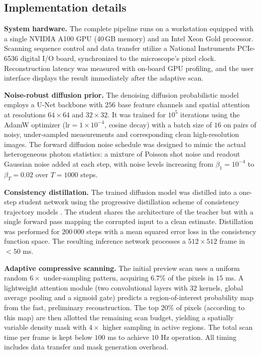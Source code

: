 \documentclass{article}
\begin{document}
\subsection{Implementation details}
\label{subsec:implementation}
\textbf{System hardware.} The complete pipeline runs on a workstation equipped with a single NVIDIA A100 GPU (40\,GB memory) and an Intel Xeon Gold processor. Scanning sequence control and data transfer utilize a National Instruments PCIe-6536 digital I/O board, synchronized to the microscope’s pixel clock. Reconstruction latency was measured with on-board GPU profiling, and the user interface displays the result immediately after the adaptive scan.

\textbf{Noise-robust diffusion prior.} The denoising diffusion probabilistic model employs a U-Net backbone with $256$ base feature channels and spatial attention at resolutions $64\times64$ and $32\times32$. It was trained for $10^5$ iterations using the AdamW optimizer ($\mathrm{lr}=1\times10^{-4}$, cosine decay) with a batch size of $16$ on pairs of noisy, under-sampled measurements and corresponding clean high-resolution images. The forward diffusion noise schedule was designed to mimic the actual heterogeneous photon statistics: a mixture of Poisson shot noise and readout Gaussian noise added at each step, with noise levels increasing from $\beta_1=10^{-4}$ to $\beta_T=0.02$ over $T=1000$ steps.

\textbf{Consistency distillation.} The trained diffusion model was distilled into a one-step student network using the progressive distillation scheme of consistency trajectory models \cite{CTM}. The student shares the architecture of the teacher but with a single forward pass mapping the corrupted input to a clean estimate. Distillation was performed for $200\,000$ steps with a mean squared error loss in the consistency function space. The resulting inference network processes a $512\times512$ frame in $<50$ ms.

\textbf{Adaptive compressive scanning.} The initial preview scan uses a uniform random $6\times$ under-sampling pattern, acquiring $6.7\%$ of the pixels in $15$ ms. A lightweight attention module (two convolutional layers with $32$ kernels, global average pooling and a sigmoid gate) predicts a region-of-interest probability map from the fast, preliminary reconstruction. The top $20\%$ of pixels (according to this map) are then allotted the remaining scan budget, yielding a spatially variable density mask with $4\times$ higher sampling in active regions. The total scan time per frame is kept below $100$ ms to achieve $10$ Hz operation. All timing includes data transfer and mask generation overhead.
\end{document}
